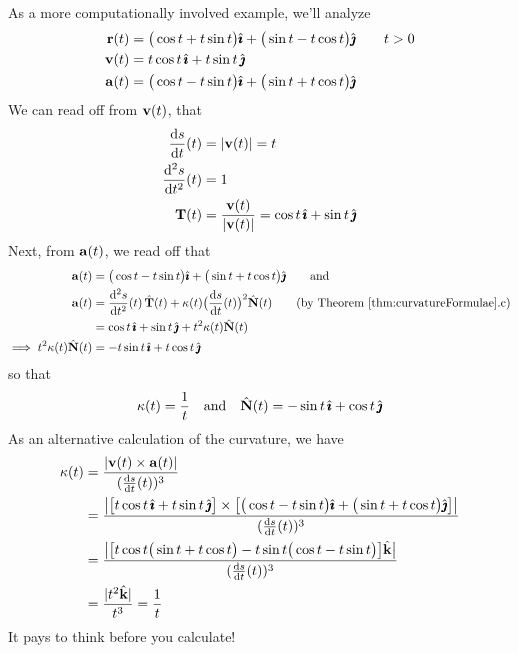 \begin{eg}\label{eg:curvatureEtc}
As a more computationally involved example, we'll analyze
\begin{align*}
\mathbf{r}(t) &= \big(\cos t + t\sin t\big)\hat{\pmb{\imath}} +\big(\sin t-t\cos t\big)\hat{\pmb{\jmath}}
\qquad t>0 \\
\mathbf{v}(t) &= t\cos t\,\hat{\pmb{\imath}} + t\sin t\,\hat{\pmb{\jmath}} \\
\mathbf{a}(t) &= \big(\cos t - t\sin t\big)\hat{\pmb{\imath}} +\big(\sin t+t\cos t\big)\hat{\pmb{\jmath}} 
\end{align*}
We can read off from $\mathbf{v}(t)$, that
\begin{align*}
\diff{s}{t}(t) &= |\vv(t)| =t \\
\difftwo{s}{t}(t) &= 1 \\
\vT(t)&=\frac{\vv(t)}{|\vv(t)|} = \cos t\,\hi + \sin t\,\hj
\end{align*}
Next, from $\mathbf{a}(t)$, we read off that
\begin{align*}
\va(t) &=\big(\cos t - t\sin t\big)\hi +\big(\sin t+t\cos t\big)\hj\qquad
\text{and}  \\
\va(t)&=\difftwo{s}{t}(t)\,\hat\vT(t)
                             +\ka(t)\big(\diff{s}{t}(t)\big)^2\hat\vN(t)
\qquad\text{(by Theorem \ref{thm:curvatureFormulae}.c)} \\
&=\cos t\,\hi + \sin t\,\hj +t^2\ka(t) \hat\vN(t) \\
\implies 
t^2\ka(t) \hat\vN(t)&= - t\sin t\,\hi + t\cos t\,\hj
\end{align*}
so that 
\begin{align*}
\kappa(t) = \frac{1}{t} \quad\text{and}\quad
\hat{\mathbf{N}}(t)= -\sin t\,\hat{\pmb{\imath}} + \cos t\,\hat{\pmb{\jmath}}
\end{align*}
As an alternative calculation of the curvature, we have
\begin{align*}
\ka(t)
&=\frac{|\vv(t)\times\va(t)|}{(\diff{s}{t}(t))^3} \\
&=\frac{\big|\big[t\cos t\,\hi + t\sin t\,\hj\big]\times
      \big[\big(\cos t - t\sin t\big)\hi +\big(\sin t+t\cos t\big)\hj\big]\big|}
{(\diff{s}{t}(t))^3} \\
&=\frac{\big|\big[t\cos t\big(\sin t+t\cos t\big)
                 -t\sin t\big(\cos t - t\sin t\big)\big]\hk\big|}
{(\diff{s}{t}(t))^3} \\
&=\frac{|t^2\hk|}{t^3}
=\frac{1}{t}
\end{align*}
It pays to think before you calculate!
\end{eg}

